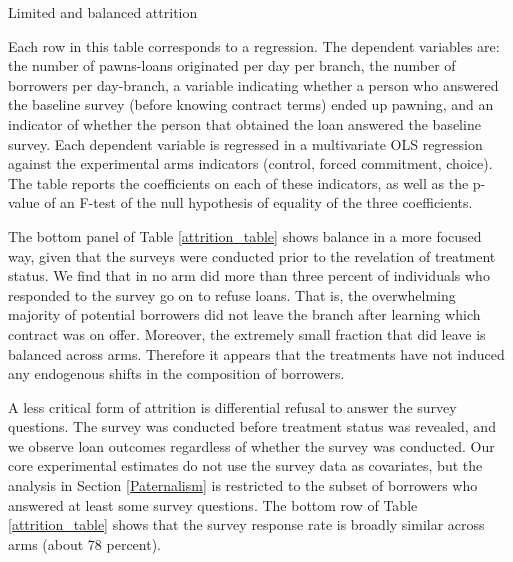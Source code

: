 \begin{appendix}
\begin{table}
\caption{Limited and balanced attrition}
\label{attrition_table}
\begin{center}
\footnotesize{}
\end{center}
\footnotesize{Each row in this table 
 corresponds to a regression. The dependent variables are: the number of pawns-loans originated per day per branch, the number of borrowers per day-branch, a variable indicating whether a person who answered the baseline survey (before knowing contract terms) ended up pawning, and an indicator of whether the person that obtained the loan answered the baseline survey. Each dependent variable is regressed in a multivariate OLS regression against the experimental arms indicators (control, forced commitment, choice). The table reports the coefficients on each of these indicators, as well as the p-value of an F-test of the null hypothesis of equality of the three coefficients. %
 }
\end{table}


The bottom panel of Table \ref{attrition_table} shows balance in a more focused way, given that the surveys were conducted prior to the revelation of treatment status. We find that in no arm did more than three percent of individuals who responded to the survey go on to refuse loans. That is, the overwhelming majority of potential borrowers did not leave the branch after learning which contract was on offer. Moreover, the extremely small fraction that did leave is balanced across arms.  Therefore it appears that the treatments have not induced any endogenous shifts in the composition of borrowers. 

A less critical form of attrition is differential refusal to answer the survey questions.  The survey was conducted before treatment status was revealed, and we observe loan outcomes regardless of whether the survey was conducted.  Our core experimental estimates do not use the survey data as covariates, but the analysis in Section \ref{Paternalism} is restricted to the subset of borrowers who answered at least some survey questions. The bottom row of Table \ref{attrition_table} shows that the survey response rate is broadly similar across arms (about 78 percent). 



\end{appendix}

